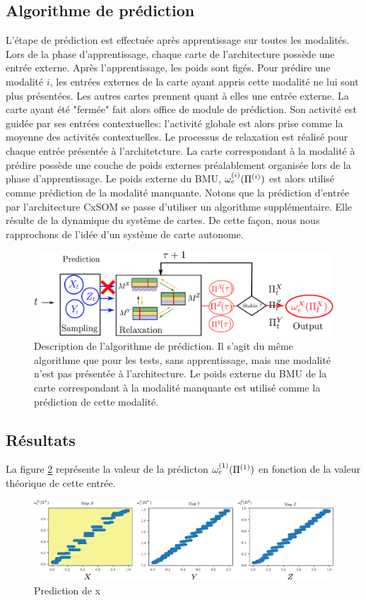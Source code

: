 \subsection{Algorithme de prédiction}

L'étape de prédiction est effectuée après apprentissage sur toutes les modalités.
Lors de la phase d'apprentissage, chaque carte de l'architecture possède une entrée externe. Après l'apprentissage, les poids sont figés.
Pour prédire une modalité $i$, les entrées externes de la carte ayant appris cette modalité ne lui sont plus présentées. Les autres cartes prennent quant à elles une entrée externe.
La carte ayant été "fermée" fait alors office de module de prédiction. Son activité est guidée par ses entrées contextuelles: l'activité globale est alors prise comme la moyenne des activités contextuelles. Le processus de relaxation est réalisé pour chaque entrée présentée à l'architetcture.
La carte correspondant à la modalité à prédire possède une couche de poids externes préalablement organisée lors de la phase d'apprentissage. Le poids externe du BMU, $\omega_{e}^{({i})}(\Pi^{({i})})$ est alors utilisé comme prédiction de la modalité manquante. 
Notons que la prédiction d'entrée par l'architecture CxSOM se passe d'utiliser un algorithme supplémentaire. Elle résulte de la dynamique du système de cartes. De cette façon, nous nous rapprochons de l'idée d'un système de carte autonome.

\begin{figure}
\centering
\includegraphics[width=\textwidth]{prediction_setup}
\caption{Description de l'algorithme de prédiction. Il s'agit du même algorithme que pour les tests, sans apprentissage, mais une modalité n'est pas présentée à l'architecture. Le poids externe du BMU de la carte correspondant à la modalité manquante est utilisé comme la prédiction de cette modalité.}
\label{fig:schema}
\end{figure}


\subsection{Résultats}
La figure \ref{fig:pred} représente la valeur de la prédicton $\omega_{e}^{({1})}(\Pi^{({1})})$ en fonction de la valeur théorique de cette entrée. 
\begin{figure}
\centering
\includegraphics[width=\textwidth]{prediction_x2}
\caption{Prediction de x}
\label{fig:pred}
\end{figure}


